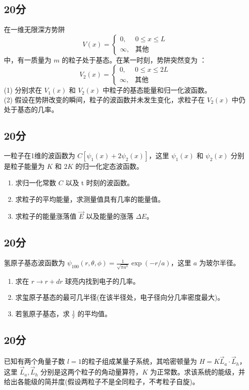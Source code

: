 \subsection{20分}
在一维无限深方势阱
\[
V(x) = 
\begin{cases}
0, & 0 \leq x \leq L \\
\infty, & \text{其他}
\end{cases}~
\]
中，有一质量为 $m$ 的粒子处于基态。在某一时刻，势阱突然变为 ：
\[
V_2(x) = 
\begin{cases}
0, & 0 \leq x \leq 2L \\
\infty, & \text{其他}
\end{cases}~
\]
(1) 分别求在 $V_1(x)$ 和 $V_2(x)$ 中粒子的基态能量和归一化波函数。\\
(2) 假设在势阱改变的瞬间，粒子的波函数并未发生变化，求粒子在 $V_2(x)$ 中仍处于基态的几率。
\subsection{20分}
一粒子在1维的波函数为 $C[\psi_1(x) + 2\psi_2(x)]$，这里 $\psi_1(x)$ 和 $\psi_2(x)$ 分别是粒子能量为 $K$ 和 $2K$ 的归一化定态波函数。
\begin{enumerate}
    \item 求归一化常数 $C$ 以及 t 时刻的波函数。
    \item 求粒子的平均能量，求测量值具有几率的能量值。
    \item 求粒子的能量涨落值 $ \vec E $ 以及能量的涨落 $\Delta E$。
\end{enumerate}
\subsection{20分}
氢原子基态波函数为 $\psi_{100}(r, \theta, \phi) = \frac{1}{\sqrt{\pi a^3}} \exp(-r/a)$，这里 $a$ 为玻尔半径。
\begin{enumerate}
    \item 求在 $r \to r+dr$ 球亮内找到电子的几率。
    \item 求玺原子基态的最可几半径(在该半径处，电子径向分几率密度最大)。
    \item 若氢原子基态，求 $\frac{1}{r}$ 的平均值。
\end{enumerate}
\subsection{20分}
已知有两个角量子数 $l=1$的粒子组成某量子系统，其哈密顿量为 $H = K \vec L_a \cdot\vec L_h$，这里 $\vec L_a, \vec L_h$ 分别是这两个粒子的角动量算符，$K$ 为正常数。求该系统的能级，并给出各能级的简并度(假设两粒子不是全同粒子，不考粒子自旋)。
